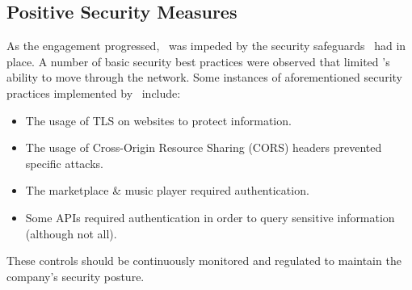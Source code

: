 \subsection{Positive Security Measures}
As the engagement progressed, \teamname\ was impeded by the security safeguards \cptc\ had in place.  A number of basic security best practices were observed that limited \teamname 's ability to move through the network. Some instances of aforementioned security practices implemented by \cptc\ include:

\begin{itemize}
    \item The usage of TLS on websites to protect information.
    \item The usage of Cross-Origin Resource Sharing (CORS) headers prevented specific attacks.
    \item The marketplace \& music player required authentication.
    \item Some APIs required authentication in order to query sensitive information (although not all).
\end{itemize}

These controls should be continuously monitored and regulated to maintain the company's security posture.

%